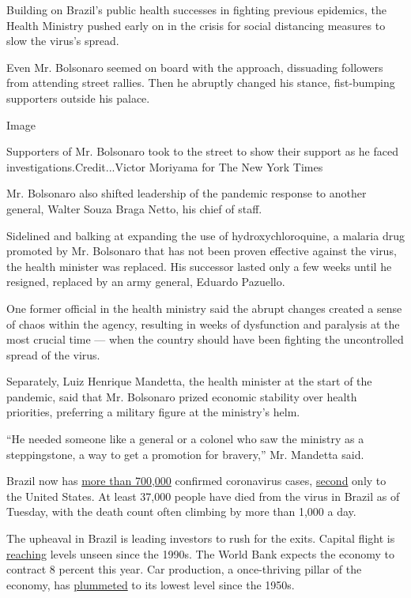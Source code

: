 Building on Brazil's public health successes in fighting previous
epidemics, the Health Ministry pushed early on in the crisis for social
distancing measures to slow the virus's spread.

Even Mr. Bolsonaro seemed on board with the approach, dissuading
followers from attending street rallies. Then he abruptly changed his
stance, fist-bumping supporters outside his palace.

Image

Supporters of Mr. Bolsonaro took to the street to show their support as
he faced investigations.Credit...Victor Moriyama for The New York Times

Mr. Bolsonaro also shifted leadership of the pandemic response to
another general, Walter Souza Braga Netto, his chief of staff.

Sidelined and balking at expanding the use of hydroxychloroquine, a
malaria drug promoted by Mr. Bolsonaro that has not been proven
effective against the virus, the health minister was replaced. His
successor lasted only a few weeks until he resigned, replaced by an army
general, Eduardo Pazuello.

One former official in the health ministry said the abrupt changes
created a sense of chaos within the agency, resulting in weeks of
dysfunction and paralysis at the most crucial time --- when the country
should have been fighting the uncontrolled spread of the virus.

Separately, Luiz Henrique Mandetta, the health minister at the start of
the pandemic, said that Mr. Bolsonaro prized economic stability over
health priorities, preferring a military figure at the ministry's helm.

``He needed someone like a general or a colonel who saw the ministry as
a steppingstone, a way to get a promotion for bravery,'' Mr. Mandetta
said.

Brazil now has
\href{https://www.nytimes3xbfgragh.onion/interactive/2020/world/coronavirus-maps.html}{more
than 700,000} confirmed coronavirus cases,
\href{https://www.nytimes3xbfgragh.onion/interactive/2020/world/coronavirus-maps.html}{second}
only to the United States. At least 37,000 people have died from the
virus in Brazil as of Tuesday, with the death count often climbing by
more than 1,000 a day.

The upheaval in Brazil is leading investors to rush for the exits.
Capital flight is
\href{https://economia.uol.com.br/colunas/jose-paulo-kupfer/2020/05/27/fuga-de-capitais-se-acentua-e-alerta-para-falta-de-confianca-no-brasil.htm}{reaching}
levels unseen since the 1990s. The World Bank expects the economy to
contract 8 percent this year. Car production, a once-thriving pillar of
the economy, has
\href{https://www.terra.com.br/parceiros/guia-do-carro/industria-automobilistica-tem-o-pior-resultado-desde-1957,2607f811c62d5d3abc66af24c1cb08712gk0gjq1.html}{plummeted}
to its lowest level since the 1950s.

